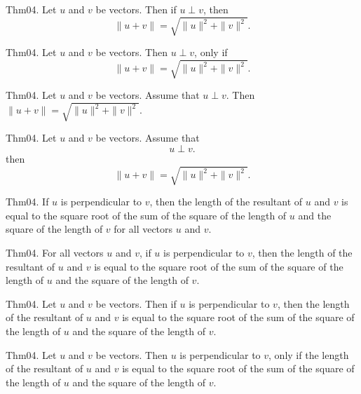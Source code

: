 \documentclass{article}
\begin{document}
Thm04. Let $u$ and $v$ be vectors. Then if $u \perp v$, then $$\| u + v \| = \sqrt{ \| u \| ^{ 2}+ \| v \| ^{ 2}}.$$

Thm04. Let $u$ and $v$ be vectors. Then $u \perp v$, only if $$\| u + v \| = \sqrt{ \| u \| ^{ 2}+ \| v \| ^{ 2}}.$$

Thm04. Let $u$ and $v$ be vectors. Assume that $u \perp v$. Then $\| u + v \| = \sqrt{ \| u \| ^{ 2}+ \| v \| ^{ 2}}$.

Thm04. Let $u$ and $v$ be vectors. Assume that $$u \perp v.$$ then $$\| u + v \| = \sqrt{ \| u \| ^{ 2}+ \| v \| ^{ 2}}.$$

Thm04. If $u$ is perpendicular to $v$, then the length of the resultant of $u$ and $v$ is equal to the square root of the sum of the square of the length of $u$ and the square of the length of $v$ for all vectors $u$ and $v$.

Thm04. For all vectors $u$ and $v$, if $u$ is perpendicular to $v$, then the length of the resultant of $u$ and $v$ is equal to the square root of the sum of the square of the length of $u$ and the square of the length of $v$.

Thm04. Let $u$ and $v$ be vectors. Then if $u$ is perpendicular to $v$, then the length of the resultant of $u$ and $v$ is equal to the square root of the sum of the square of the length of $u$ and the square of the length of $v$.

Thm04. Let $u$ and $v$ be vectors. Then $u$ is perpendicular to $v$, only if the length of the resultant of $u$ and $v$ is equal to the square root of the sum of the square of the length of $u$ and the square of the length of $v$.
\end{document}
